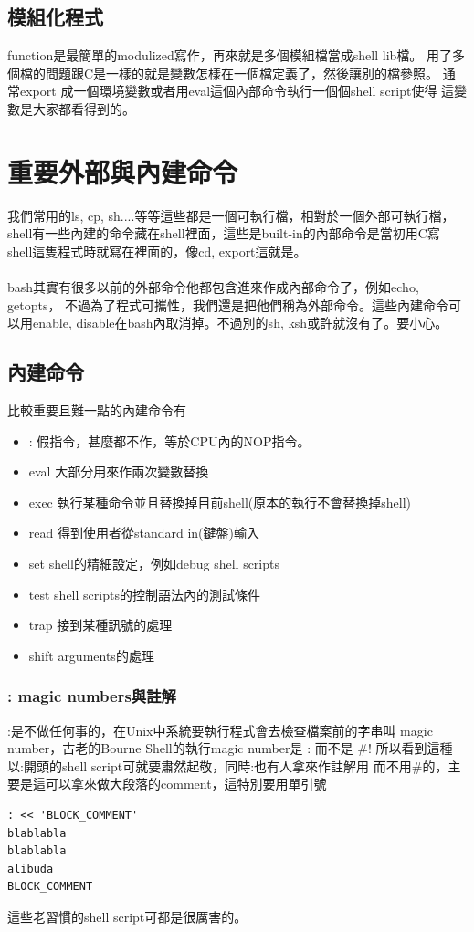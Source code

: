     \subsection{模組化程式}
    function是最簡單的modulized寫作，再來就是多個模組檔當成shell lib檔。
    用了多個檔的問題跟C是一樣的就是變數怎樣在一個檔定義了，然後讓別的檔參照。
    通常export 成一個環境變數或者用eval這個內部命令執行一個個shell script使得
    這變數是大家都看得到的。

    \section{重要外部與內建命令}
    我們常用的ls, cp, sh....等等這些都是一個可執行檔，相對於一個外部可執行檔，
    shell有一些內建的命令藏在shell裡面，這些是built-in的內部命令是當初用C寫
    shell這隻程式時就寫在裡面的，像cd, export這就是。
    \\\\
    bash其實有很多以前的外部命令他都包含進來作成內部命令了，例如echo, getopts，
    不過為了程式可攜性，我們還是把他們稱為外部命令。這些內建命令可以用enable, 
    disable在bash內取消掉。不過別的sh, ksh或許就沒有了。要小心。
    \subsection{內建命令}
    比較重要且難一點的內建命令有
    \begin{itemize}
      \item : 假指令，甚麼都不作，等於CPU內的NOP指令。
      \item eval 大部分用來作兩次變數替換
      \item exec 執行某種命令並且替換掉目前shell(原本的執行不會替換掉shell)
      \item read 得到使用者從standard in(鍵盤)輸入
      \item set shell的精細設定，例如debug shell scripts
      \item test shell scripts的控制語法內的測試條件
      \item trap 接到某種訊號的處理
      \item shift arguments的處理
    \end{itemize}
    \subsubsection{ : magic numbers與註解}
    :是不做任何事的，在Unix中系統要執行程式會去檢查檔案前的字串叫
    magic number，古老的Bourne Shell的執行magic number是 : 而不是 \#!
    所以看到這種以:開頭的shell script可就要肅然起敬，同時:也有人拿來作註解用
    而不用\#的，主要是這可以拿來做大段落的comment，這特別要用單引號
    \begin{verbatim}
: << 'BLOCK_COMMENT'
blablabla
blablabla
alibuda
BLOCK_COMMENT
    \end{verbatim}
    這些老習慣的shell script可都是很厲害的。
